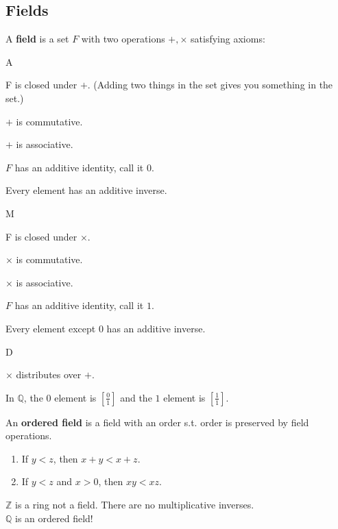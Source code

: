 \documentclass[../main.tex]{subfiles}
\begin{document}

\subsection{Fields}

\begin{definition}[Field]
    A \textbf{field} is a set \( F \) with two operations \( +, \times \) satisfying axioms:
    \begin{axioms}{A}
        \item F is closed under \( + \). (Adding two things in the set gives you something in the set.)
        \item \( + \) is commutative.
        \item \( + \) is associative.
        \item \( F \) has an additive identity, call it 0.
        \item Every element has an additive inverse.
    \end{axioms}
    \begin{axioms}{M}
        \item F is closed under \( \times \).
        \item \( \times \) is commutative.
        \item \( \times \) is associative.
        \item \( F \) has an additive identity, call it \( 1 \).
        \item Every element except \( 0 \) has an additive inverse.
    \end{axioms}
    \begin{axioms}{D}
        \item \( \times \) distributes over \( + \).
    \end{axioms}
\end{definition}

\begin{example}[]
    In \( \mathbb{Q} \), the \( 0 \) element is \( \displaystyle \left[ \frac{0}{1} \right]\)
    and the \( 1 \) element is \( \displaystyle \left[ \frac{1}{1} \right] \).


\end{example}

\begin{definition}
    An \textbf{ordered field} is a field with an order s.t. order is preserved by field operations.
    \begin{enumerate}
        \item If \( y<z \), then \( x+y <x+z \).
        \item If \( y<z \) and \( x>0 \), then \( xy<xz \).
    \end{enumerate}
\end{definition}

\begin{note}
    \( \mathbb{Z} \) is a ring not a field. There are no multiplicative inverses. \\
    \( \mathbb{Q} \) is an ordered field!
\end{note}
\end{document}
